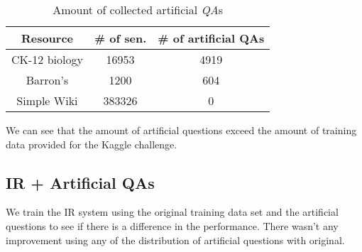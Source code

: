 \begin{table}[htp]
\caption{Amount of collected artificial \emph{QA}s}
\begin{center}
\begin{tabular}{|c|c|c|}
\hline
Resource&\# of sen.& \# of artificial QAs\\
\hline
CK-12 biology & 16953 & 4919\\
Barron's & 1200 & 604 \\
Simple Wiki & 383326 & 0\\
\hline
\end{tabular}
\end{center}
\label{artificialqa}
\end{table}%

We can see that the amount of artificial questions exceed the amount of training data provided for the Kaggle challenge.

\subsection{IR + Artificial QAs}
We train the IR system using the original training data set and the artificial questions to see if there is a difference in the performance. There wasn't any improvement using any of the distribution of artificial questions with original.
